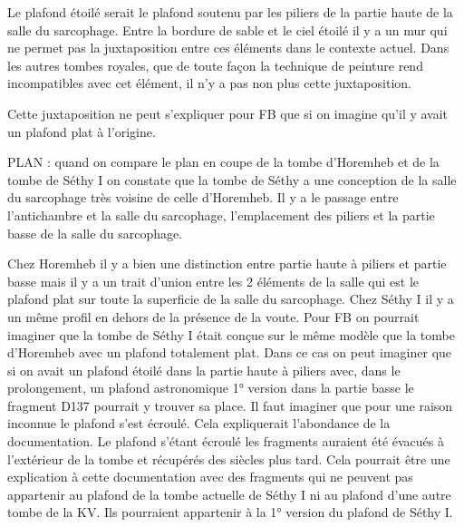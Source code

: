 \documentclass{article}
\begin{document}
Le plafond étoilé serait le plafond soutenu par les piliers de la partie
haute de la salle du sarcophage. Entre la bordure de sable et le ciel
étoilé il y a un mur qui ne permet pas la juxtaposition entre ces
éléments dans le contexte actuel. Dans les autres tombes royales, que
de toute façon la technique de peinture rend incompatibles avec cet
élément, il n’y a pas  non plus cette juxtaposition. 

Cette juxtaposition ne peut s’expliquer pour FB que si on imagine qu’il
y avait un plafond plat à l’origine. 

PLAN : quand on compare le plan en coupe de la tombe d’Horemheb et de la
tombe de Séthy I on constate que la tombe de Séthy a une conception de
la salle du sarcophage très voisine de celle d’Horemheb. Il y a le
passage entre l’antichambre et la salle du sarcophage, l’emplacement
des piliers et la partie basse de la salle du sarcophage. 

Chez Horemheb il y a bien une distinction entre partie haute à piliers
et partie basse mais il y a un trait d’union entre les 2 éléments de la
salle qui est le plafond plat sur toute la superficie de la salle du
sarcophage. Chez Séthy I il y a un même profil en dehors de la présence
de la voute. Pour FB on pourrait imaginer que la tombe de Séthy I était
conçue sur le même modèle que la tombe d’Horemheb avec un plafond
totalement plat. Dans ce cas on peut imaginer que si on avait un
plafond étoilé dans la partie haute à piliers avec, dans le
prolongement, un plafond astronomique 1° version dans la partie basse
le fragment D137 pourrait y trouver sa place. Il faut imaginer que pour
une raison inconnue le plafond s’est écroulé. Cela expliquerait
l’abondance de la documentation. Le plafond s’étant écroulé les
fragments auraient été évacués à l’extérieur de la tombe et récupérés
des siècles plus tard. Cela pourrait être une explication à cette
documentation avec des fragments qui ne peuvent pas appartenir au
plafond de la tombe actuelle de Séthy I ni au plafond d’une autre tombe
de la KV. Ils pourraient appartenir à la 1° version du plafond de Séthy
I.
\end{document}
